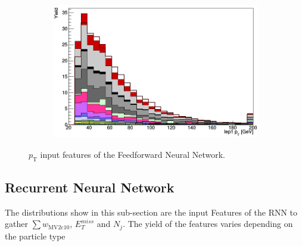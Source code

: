 \begin{figure}[H]
\begin{subfigure}{.5\textwidth}
\end{subfigure}
\begin{subfigure}{.5\textwidth}
  \centering
  \includegraphics[width=.99\linewidth]{figs/features/lep_1_pt}
\end{subfigure}
\caption{$p_{\text{T}}$ input features of the Feedforward Neural Network.}
\end{figure}

\newpage

\subsection*{Recurrent Neural Network}

The distributions show in this sub-section are the input Features of the RNN to gather $\sum w_{\text{MV2c10}}$, $E_{T}^{miss}$ and $N_j$. The yield of the features varies depending on the particle type

